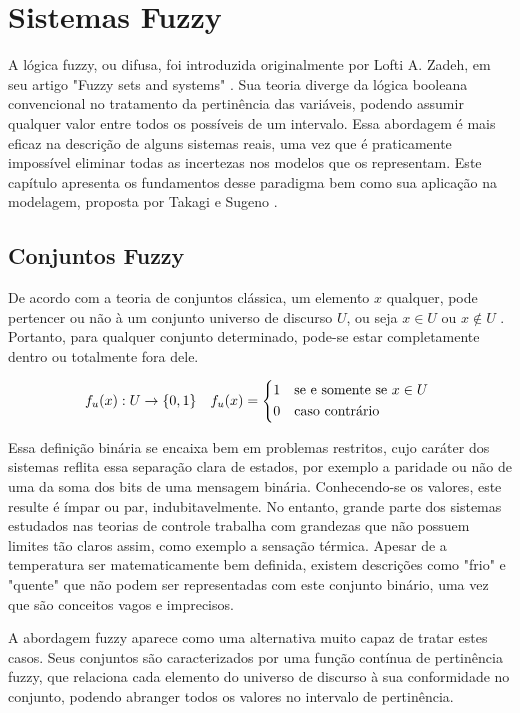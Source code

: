 %

\chapter{Sistemas Fuzzy} \label{capFundFuzzy}
A lógica fuzzy, ou difusa, foi introduzida originalmente por Lofti A. Zadeh, em seu artigo "Fuzzy sets and systems" \cite{zadeh}. Sua teoria diverge da lógica booleana convencional no tratamento da pertinência das variáveis, podendo assumir qualquer valor entre todos os possíveis de um intervalo. Essa abordagem é mais eficaz na descrição de alguns sistemas reais, uma vez que é praticamente impossível eliminar todas as incertezas nos modelos que os representam. Este capítulo apresenta os fundamentos desse paradigma bem como sua aplicação na modelagem, proposta por Takagi e Sugeno \cite{takagiSugeno}.

\section{Conjuntos Fuzzy}
De acordo com a teoria de conjuntos clássica, um elemento $x$ qualquer, pode pertencer ou não à um conjunto universo de discurso $U$, ou seja $x \in U$ ou $x \notin U$ . Portanto, para qualquer conjunto determinado, pode-se estar completamente dentro ou totalmente fora dele.

\begin{align}
	f_u(x) : U \rightarrow \{0,1\}
	&& f_u(x) =
	\begin{cases*}
		1 & se e somente se $x \in U$ \\
		0 & caso contrário
	\end{cases*}
	\label{eqFPertinencia}
\end{align}

Essa definição binária se encaixa bem em problemas restritos, cujo caráter dos sistemas reflita essa separação clara de estados, por exemplo a paridade ou não de uma da soma dos bits de uma mensagem binária. Conhecendo-se os valores, este resulte é ímpar ou par, indubitavelmente. No entanto, grande parte dos sistemas estudados nas teorias de controle trabalha com grandezas que não possuem limites tão claros assim, como exemplo a sensação térmica. Apesar de a temperatura ser matematicamente bem definida, existem descrições como "frio" e "quente" que não podem ser representadas com este conjunto binário, uma vez que são conceitos vagos e imprecisos.

A abordagem fuzzy aparece como uma alternativa muito capaz de tratar estes casos. Seus conjuntos são caracterizados por uma função contínua de pertinência fuzzy, que relaciona cada elemento do universo de discurso à sua conformidade no conjunto, podendo abranger todos os valores no intervalo de pertinência.

